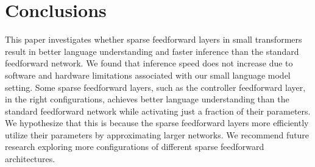 \section{Conclusions}
\label{sec:conclusion}
This paper investigates whether sparse feedforward layers in small transformers result in better language understanding and faster inference than the standard feedforward network. We found that inference speed does not increase due to software and hardware limitations associated with our small language model setting. Some sparse feedforward layers, such as the controller feedforward layer, in the right configurations, achieves better language understanding than the standard feedforward network while activating just a fraction of their parameters. We hypothesize that this is because the sparse feedforward layers more efficiently utilize their parameters by approximating larger networks. We recommend future research exploring more configurations of different sparse feedforward architectures.




